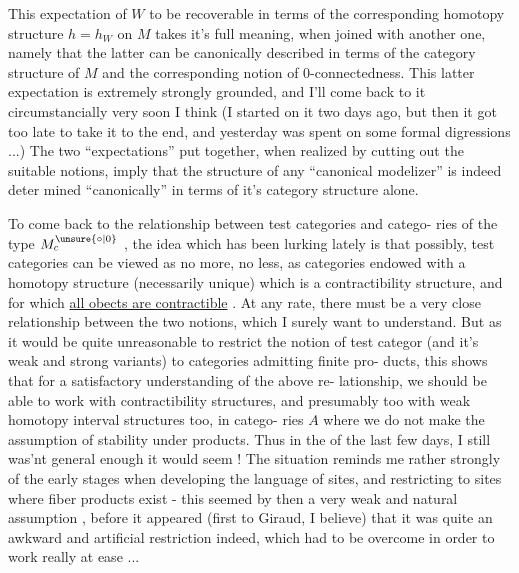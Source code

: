 
This expectation of $W$ to be recoverable in terms of the corresponding
homotopy structure $h = h_{W}$ on $M$ takes it's full meaning,  when joined with
another one,   namely that the latter can be canonically described in
terms of the category structure of $M$  and the corresponding notion of
0-connectedness.  This latter expectation is extremely strongly grounded,
and I'll come back to it circumstancially very soon I think  (I started
on it two days ago,  but then it got too late to take it to the end, and
yesterday was spent on some formal digressions ...)  The two ``expectations''
put together,  when realized by  cutting out the suitable notions,
 imply that the structure of any ``canonical modelizer'' is indeed deter%
mined ``canonically'' in terms of it's category structure alone.

To come back to the relationship between test categories and catego-%
ries of the type $M^{\unsure{\circ|0}}_{c}$ ,  the idea which has been lurking  lately is
that possibly,  test categories can be viewed as no more,  no less,  as
categories endowed with  a homotopy structure (necessarily
unique)  which is a contractibility structure,  and for which \uline{all obects
are contractible} .  At any rate,  there must be a very close relationship
between the two notions,  which I surely want to understand.  But as it
would be quite unreasonable to restrict the notion of  test categor
(and it's weak and strong variants) to categories admitting finite pro-%
ducts,  this shows that for a satisfactory understanding of the above re-%
lationship,  we should be able to work with contractibility structures,
and presumably too with weak homotopy interval structures too,  in catego-%
ries $A$ where we do not make the assumption of stability under products.
Thus in the  of the last few days,  I still was'nt general enough
it would seem !  The situation reminds me rather strongly of the early
stages when developing the language of sites,  and restricting to sites
where fiber products exist  -  this seemed by then a very weak and natural
assumption ,  before it appeared (first to Giraud, I believe) that
it was quite an awkward and artificial restriction indeed,  which had to
be overcome in order to work really at ease ...

